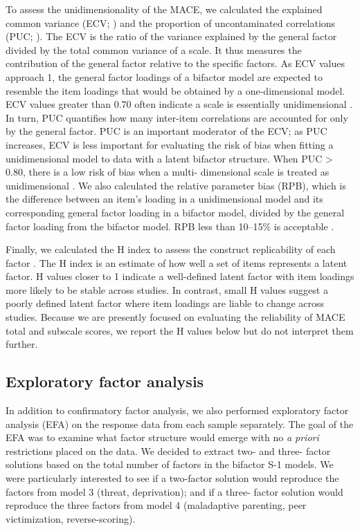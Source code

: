 \documentclass[letterpaper,man,natbib,floatsintext,longtable]{apa6}
\begin{document}
To assess the unidimensionality of the MACE, we calculated the explained common variance (ECV; \citealt{sijtsma2009use}) and the proportion of uncontaminated correlations (PUC; \citealt{reise2013multidimensionality}). The ECV is the ratio of the variance explained by the general factor divided by the total common variance of a scale. It thus measures the contribution of the general factor relative to the specific factors. As ECV values approach 1, the general factor loadings of a bifactor model are expected to resemble the item loadings that would be obtained by a one-dimensional model. ECV values greater than 0.70 often indicate a scale is essentially unidimensional \citep{rodriguez2016applying}. In turn, PUC quantifies how many inter-item correlations are accounted for only by the general factor. PUC is an important moderator of the ECV; as PUC increases, ECV is less important for evaluating the risk of bias when fitting a unidimensional model to data with a latent bifactor structure. When PUC > 0.80, there is a low risk of bias when a multi- dimensional scale is treated as unidimensional \citep{reise2013multidimensionality}. We also calculated the relative parameter bias (RPB), which is the difference between an item's loading in a unidimensional model and its corresponding general factor loading in a bifactor model, divided by the general factor loading from the bifactor model. RPB less than 10–15\% is acceptable \citep{muthen1987structural}.

Finally, we calculated the H index to assess the construct replicability of each factor \citep{hancock2001rethinking}. The H index is an estimate of how well a set of items represents a latent factor. H values closer to 1 indicate a well-defined latent factor with item loadings more likely to be stable across studies. In contrast, small H values suggest a poorly defined latent factor where item loadings are liable to change across studies. Because we are presently focused on evaluating the reliability of MACE total and subscale scores, we report the H values below but do not interpret them further.

\subsection{Exploratory factor analysis}

In addition to confirmatory factor analysis, we also performed exploratory factor analysis (EFA) on the response data from each sample separately. The goal of the EFA was to examine what factor structure would emerge with no \emph{a priori} restrictions placed on the data. We decided to extract two- and three- factor solutions based on the total number of factors in the bifactor S-1 models. We were particularly interested to see if a two-factor solution would reproduce the factors from model 3 (threat, deprivation); and if a three- factor solution would reproduce the three factors from model 4 (maladaptive parenting, peer victimization, reverse-scoring). 
\end{document}
